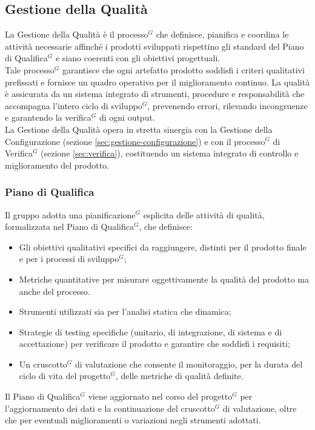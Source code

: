 \subsection{Gestione della Qualità}
\label{sec:gestione-qualita}
La Gestione della Qualità è il processo$^G$ che definisce, pianifica e coordina le attività necessarie affinché i prodotti sviluppati rispettino gli standard del Piano di Qualifica$^G$ e siano coerenti con gli obiettivi progettuali.\\
Tale processo$^G$ garantisce che ogni artefatto prodotto soddisfi i criteri qualitativi prefissati e fornisce un quadro operativo per il miglioramento continuo. La qualità è assicurata da un sistema integrato di strumenti, procedure e responsabilità che accompagna l'intero ciclo di sviluppo$^G$, prevenendo errori, rilevando incongruenze e garantendo la verifica$^G$ di ogni output.\\
La Gestione della Qualità opera in stretta sinergia con la Gestione della Configurazione (sezione \ref{sec:gestione-configurazione}) e con il processo$^G$ di Verifica$^G$ (sezione \ref{sec:verifica}), costituendo un sistema integrato di controllo e miglioramento del prodotto.

\subsubsection{Piano di Qualifica}
Il gruppo adotta una pianificazione$^G$ esplicita delle attività di qualità, formalizzata nel Piano di Qualifica$^G$, che definisce:
\begin{itemize}[itemsep=3pt, parsep=1pt, label=$\scriptstyle\bullet$]
    \item Gli obiettivi qualitativi specifici da raggiungere, distinti per il prodotto finale e per i processi di sviluppo$^G$;
    \item Metriche quantitative per misurare oggettivamente la qualità del prodotto ma anche del processo.
    \item Strumenti utilizzati sia per l'analisi statica che dinamica;
    \item Strategie di testing specifiche (unitario, di integrazione, di sistema e di accettazione) per verificare il prodotto e garantire che soddisfi i requisiti;
    \item Un cruscotto$^G$ di valutazione che consente il monitoraggio, per la durata del ciclo di vita del progetto$^G$, delle metriche di qualità definite.
\end{itemize}
Il Piano di Qualifica$^G$ viene aggiornato nel corso del progetto$^G$ per l'aggiornamento dei dati e la continuazione del cruscotto$^G$ di valutazione, oltre che per eventuali miglioramenti o variazioni negli strumenti adottati.

